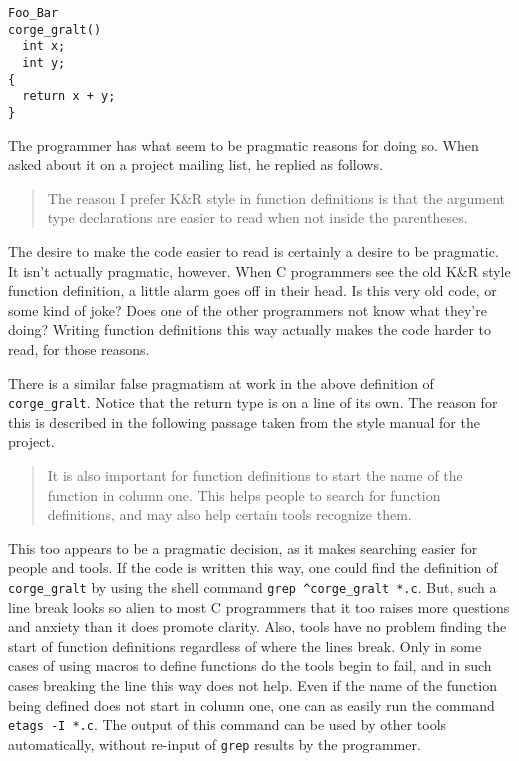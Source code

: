 \documentclass{lulu}
\newcommand{\code}[1]{\texttt{#1}\xspace}
\begin{document}
\begin{samepage}
\begin{verbatim}
Foo_Bar
corge_gralt()
  int x;
  int y;
{
  return x + y;
}
\end{verbatim}
\end{samepage}

The programmer has what seem to be pragmatic reasons for doing so.
When asked about it on a project mailing list, he replied as follows.

\begin{quote}
The reason I prefer K\&R style in function definitions is that the
argument type declarations are easier to read when not inside the
parentheses.
\end{quote}

The desire to make the code easier to read is certainly a desire to be
pragmatic.  It isn't actually pragmatic, however.  When C programmers
see the old K\&R style function definition, a little alarm goes off in
their head.  Is this very old code, or some kind of joke?  Does one of
the other programmers not know what they're doing?  Writing function
definitions this way actually makes the code harder to read, for those
reasons.

There is a similar false pragmatism at work in the above definition of
\code{corge\_gralt}.  Notice that the return type is on a line of its
own.  The reason for this is described in the following passage taken
from the style manual for the project.

\begin{quote}
It is also important for function definitions to start the name of the
function in column one.  This helps people to search for function
definitions, and may also help certain tools recognize them.
\end{quote}

This too appears to be a pragmatic decision, as it makes searching
easier for people and tools.  If the code is written this way, one
could find the definition of \code{corge\_gralt} by using the shell
command \code{grep~\^{ }corge\_gralt *.c}.  But, such a line break
looks so alien to most C programmers that it too raises more questions
and anxiety than it does promote clarity.  Also, tools have no problem
finding the start of function definitions regardless of where the
lines break.  Only in some cases of using macros to define functions
do the tools begin to fail, and in such cases breaking the line this
way does not help.  Even if the name of the function being defined
does not start in column one, one can as easily run the command
\code{etags~-I~*.c}.  The output of this command can be used by other
tools automatically, without re-input of \code{grep} results by the
programmer.
\end{document}

